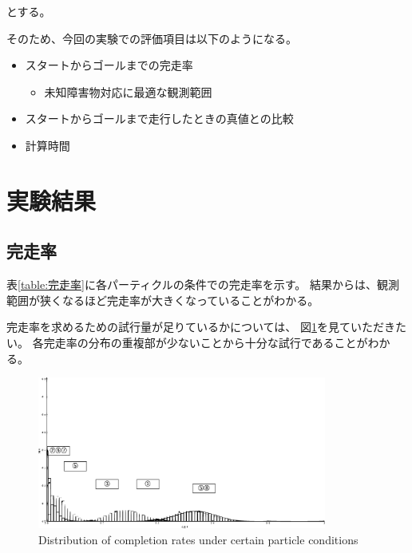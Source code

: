 \documentclass{jarticle}
\begin{document}
とする。

そのため、今回の実験での評価項目は以下のようになる。

\begin{itemize}
  \item スタートからゴールまでの完走率
  \begin{itemize}
    \item 未知障害物対応に最適な観測範囲
  \end{itemize}
  \item スタートからゴールまで走行したときの真値との比較
  \item 計算時間
\end{itemize}

\section{実験結果}%

\subsection{完走率}
表\ref{table:完走率}に各パーティクルの条件での完走率を示す。
結果からは、観測範囲が狭くなるほど完走率が大きくなっていることがわかる。

完走率を求めるための試行量が足りているかについては、
図\ref{fig: 完走率の分布}を見ていただきたい。
各完走率の分布の重複部が少ないことから十分な試行であることがわかる。

\begin{figure}[htbp]
  \centering
   \includegraphics[height=50mm]{fig/kansouritsu.eps}
   \vspace*{-4mm}
   \caption{Distribution of completion rates under certain particle conditions}
   \label{fig: 完走率の分布}
\end{figure}
\end{document}
